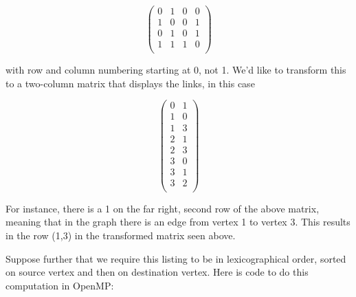 \begin{equation}
\left (
\begin{array}{rrrr}
0 & 1 & 0 & 0 \\
1 & 0 & 0 & 1 \\
0 & 1 & 0 & 1 \\
1 & 1 & 1 & 0 \\
\end{array}
\right )
\end{equation}

with row and column numbering starting at 0, not 1.  We'd like to
transform this to a two-column matrix that displays the links, in this
case

\begin{equation}
\left (
\begin{array}{rr}
0 & 1 \\
1 & 0 \\
1 & 3 \\
2 & 1 \\
2 & 3 \\
3 & 0 \\
3 & 1 \\
3 & 2 \\
\end{array}
\right )
\end{equation}

For instance, there is a 1 on the far right, second row of the above
matrix, meaning that in the graph there is an edge from vertex 1 to
vertex 3.  This results in the row (1,3) in the transformed matrix seen
above.

Suppose further that we require this listing to be in lexicographical
order, sorted on source vertex and then on destination vertex.  Here is
code to do this computation in OpenMP:

